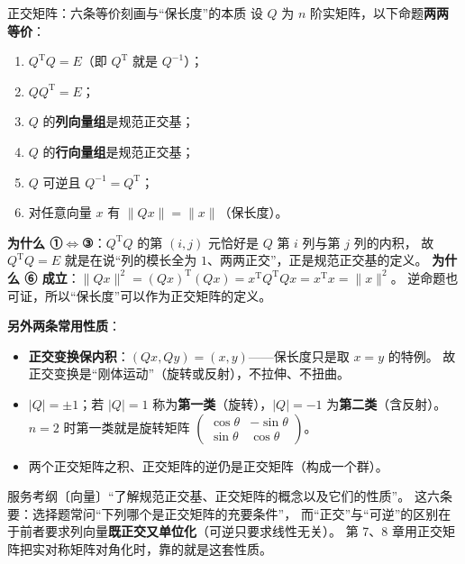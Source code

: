 \begin{fdeep}{正交矩阵：六条等价刻画与“保长度”的本质}
设 $Q$ 为 $n$ 阶实矩阵，以下命题\textbf{两两等价}：
\begin{enumerate}[leftmargin=2.2em,itemsep=0.22em]
\item $Q^{\mathrm T}Q=E$（即 $Q^{\mathrm T}$ 就是 $Q^{-1}$）；
\item $QQ^{\mathrm T}=E$；
\item $Q$ 的\textbf{列向量组}是规范正交基；
\item $Q$ 的\textbf{行向量组}是规范正交基；
\item $Q$ 可逆且 $Q^{-1}=Q^{\mathrm T}$；
\item 对任意向量 $x$ 有 $\lVert Qx\rVert=\lVert x\rVert$（保长度）。
\end{enumerate}
\textbf{为什么 ①$\iff$③}：$Q^{\mathrm T}Q$ 的第 $(i,j)$ 元恰好是 $Q$ 第 $i$ 列与第 $j$ 列的内积，
故 $Q^{\mathrm T}Q=E$ 就是在说“列的模长全为 $1$、两两正交”，正是规范正交基的定义。
\textbf{为什么 ⑥ 成立}：$\lVert Qx\rVert^{2}=(Qx)^{\mathrm T}(Qx)=x^{\mathrm T}Q^{\mathrm T}Qx=x^{\mathrm T}x=\lVert x\rVert^{2}$。
逆命题也可证，所以“保长度”可以作为正交矩阵的定义。

\textbf{另外两条常用性质}：
\begin{itemize}[leftmargin=2.2em,itemsep=0.22em]
\item \textbf{正交变换保内积}：$(Qx,Qy)=(x,y)$——保长度只是取 $x=y$ 的特例。
      故正交变换是“刚体运动”（旋转或反射），不拉伸、不扭曲。
\item $\lvert Q\rvert=\pm1$；若 $\lvert Q\rvert=1$ 称为\textbf{第一类}（旋转），$\lvert Q\rvert=-1$ 为\textbf{第二类}（含反射）。
      $n=2$ 时第一类就是旋转矩阵 $\begin{pmatrix}\cos\theta&-\sin\theta\\ \sin\theta&\cos\theta\end{pmatrix}$。
\item 两个正交矩阵之积、正交矩阵的逆仍是正交矩阵（构成一个群）。
\end{itemize}
\fbref{}服务考纲〔向量〕“了解规范正交基、正交矩阵的概念以及它们的性质”。
这六条要：选择题常问“下列哪个是正交矩阵的充要条件”，
而“正交”与“可逆”的区别在于前者要求列向量\textbf{既正交又单位化}（可逆只要求线性无关）。
第 7、8 章用正交矩阵把实对称矩阵对角化时，靠的就是这套性质。
\end{fdeep}

